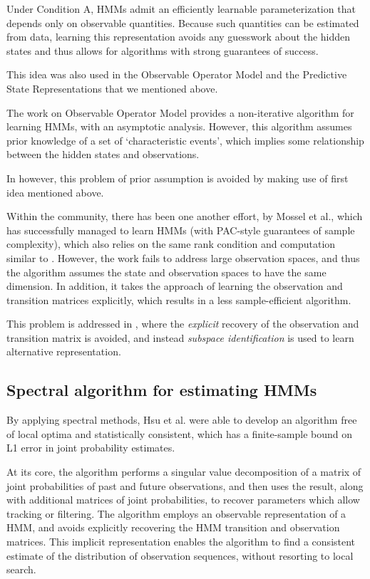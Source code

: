 Under Condition A, HMMs admit an efficiently learnable parameterization that depends
only on observable quantities. Because such quantities can be estimated from data, learning
this representation avoids any guesswork about the hidden states and thus allows for algorithms
with strong guarantees of success.


This idea was also used in the Observable Operator Model and the Predictive State Representations that we mentioned above.

The work on Observable Operator Model provides a non-iterative algorithm for learning HMMs, with an asymptotic analysis. 
However, this algorithm assumes prior knowledge of a set of ‘characteristic events’, which implies some relationship between the hidden states and observations.

In \cite{ref2} however, this problem of prior assumption is avoided by making use of first idea mentioned above.


Within the community, there has been one another effort, by Mossel et al.\cite{ref17},  which has successfully managed to learn HMMs (with PAC-style guarantees of sample complexity), which also relies on the same rank condition and computation similar to \cite{ref2}. However, the work fails to address large observation spaces, and thus the algorithm assumes the state and observation spaces to have the same dimension. In addition, it takes the approach of learning the observation and transition matrices explicitly, which results in a less sample-efficient algorithm.

This problem is addressed in \cite{ref2}, where the \textit{explicit} recovery of the observation and transition matrix is avoided, and instead \textit{subspace identification} is used to learn alternative representation.

\subsection{Spectral algorithm for estimating HMMs}

By applying spectral methods, Hsu et al.\cite{ref2} were able to develop an algorithm free of local optima and statistically consistent, which has a finite-sample bound on L1 error in joint probability estimates. 

At its core, the algorithm performs a singular value decomposition of a matrix of joint
probabilities of past and future observations, and then uses the result, along with additional matrices of joint probabilities, to recover parameters which allow tracking
or filtering. The algorithm employs an observable representation of a HMM, and avoids explicitly recovering the HMM transition and observation matrices. This implicit representation enables the algorithm to find a consistent estimate of the distribution of observation sequences, without resorting to local search.



